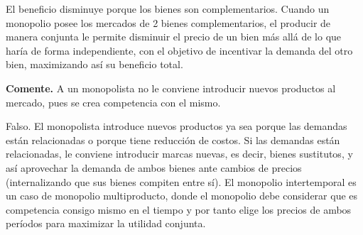 \begin{parts}
\begin{solution}
El beneficio disminuye porque los bienes son complementarios. Cuando un monopolio posee los mercados de 2 bienes complementarios, el producir de manera conjunta le permite disminuir el precio de un bien más allá de lo que haría de forma independiente, con el objetivo de incentivar la demanda del otro bien, maximizando así su beneficio total.

\end{solution}
\end{parts}

\question \textbf{Comente.} A un monopolista no le conviene introducir nuevos productos al mercado, pues se crea competencia con el mismo.
\begin{solution}
Falso. El monopolista introduce nuevos productos ya sea porque las demandas están relacionadas o porque tiene reducción de costos. Si las demandas están relacionadas, le conviene introducir marcas nuevas, es decir, bienes sustitutos, y así aprovechar la demanda de ambos bienes ante cambios de precios (internalizando que sus bienes compiten entre sí). El monopolio intertemporal es un caso de monopolio multiproducto, donde el monopolio debe considerar que es competencia consigo mismo en el tiempo y por tanto elige los precios de ambos períodos para maximizar la utilidad conjunta.

\end{solution}
